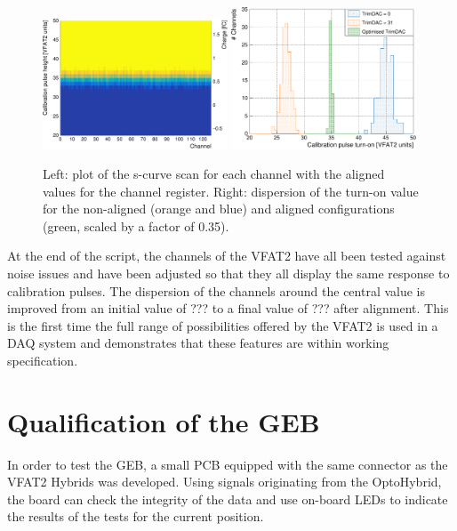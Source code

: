       \begin{figure}[h!]
        \centering
        \includegraphics[width=0.49\textwidth]{img/plots/cSCurve_ChannelVCal_Trimed-crop}
        \includegraphics[width=0.49\textwidth]{img/plots/cSCurve_ChannelVCal_Disp-crop}
        \caption{Left: plot of the s-curve scan for each channel with the aligned values for the channel register. Right: dispersion of the turn-on value for the non-aligned (orange and blue) and aligned configurations (green, scaled by a factor of 0.35).}
        \label{fig:II-4-trimed}
      \end{figure}

      At the end of the script, the channels of the VFAT2 have all been tested against noise issues and have been adjusted so that they all display the same response to calibration pulses. The dispersion of the channels around the central value is improved from an initial value of ??? to a final value of ??? after alignment. This is the first time the full range of possibilities offered by the VFAT2 is used in a DAQ system and demonstrates that these features are within working specification.


  \section{Qualification of the GEB}

    In order to test the GEB, a small PCB equipped with the same connector as the VFAT2 Hybrids was developed. Using signals originating from the OptoHybrid, the board can check the integrity of the data and use on-board LEDs to indicate the results of the tests for the current position.

